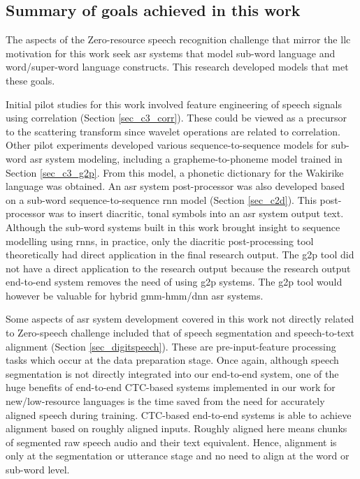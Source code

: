 \subsection{Summary of goals achieved in this work}
The aspects of the Zero-resource speech recognition challenge \citep{versteegh2015zero} that mirror the \acrlong{llc} motivation for this work seek \acrshort{asr} systems that model sub-word language and word/super-word language constructs.  This research developed models that met these goals.

Initial pilot studies for this work involved feature engineering of speech signals using correlation (Section \ref{sec_c3_corr}).  These could be viewed as a precursor to the scattering transform since wavelet operations are related to correlation.  Other pilot experiments developed various sequence-to-sequence models for sub-word \acrshort{asr} system modeling, including a grapheme-to-phoneme model trained in Section \ref{sec_c3_g2p}.  From this model, a phonetic dictionary for the Wakirike language was obtained. An \acrshort{asr} system post-processor was also developed based on a sub-word sequence-to-sequence \acrshort{rnn} model (Section \ref{sec_c2d}).  This post-processor was to insert diacritic, tonal symbols into an \acrshort{asr} system output text.  Although the sub-word systems built in this work brought insight to sequence modelling using \acrfull{rnn}s, in practice, only the diacritic post-processing tool theoretically had direct application in the final research output.  The \acrfull{g2p} tool did not have a direct application to the research output because the research output end-to-end system removes the need of using \acrshort{g2p} systems.  The \acrshort{g2p} tool would however be valuable for hybrid \acrshort{gmm}-\acrshort{hmm}/\acrshort{dnn} \acrshort{asr} systems.

Some aspects of \acrshort{asr} system development covered in this work not directly related to Zero-speech challenge included that of speech segmentation and speech-to-text alignment (Section \ref{sec_digitspeech}).  These are pre-input-feature processing tasks which occur at the data preparation stage.  Once again, although speech segmentation is not directly integrated into our end-to-end system, one of the huge benefits of end-to-end CTC-based systems implemented in our work for new/low-resource languages is the time saved from the need for accurately aligned speech during training.  CTC-based end-to-end systems is able to achieve alignment based on roughly aligned inputs.  Roughly aligned here means chunks of segmented raw speech audio and their text equivalent.  Hence, alignment is only at the segmentation or utterance stage and no need to align at the word or sub-word level.

